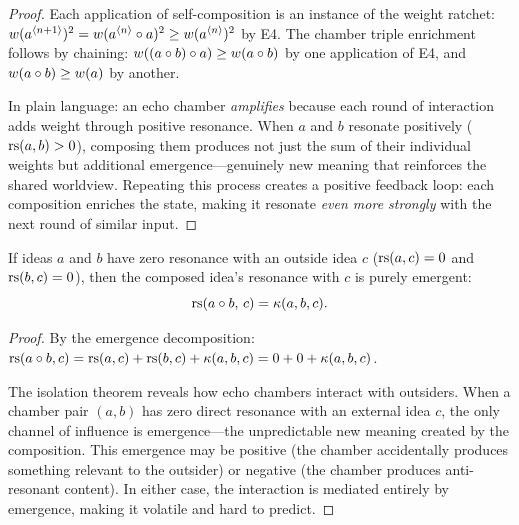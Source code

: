 \begin{proof}
Each application of self-composition is an instance of the weight ratchet:
$w(a^{\langle n+1 \rangle})^2 = w(a^{\langle n \rangle} \circ a)^2
\geq w(a^{\langle n \rangle})^2$ by E4.  The chamber triple enrichment
follows by chaining: $w((a \circ b) \circ a) \geq w(a \circ b)$
by one application of E4, and $w(a \circ b) \geq w(a)$ by another.

In plain language: an echo chamber \emph{amplifies} because each round of
interaction adds weight through positive resonance.  When $a$ and $b$
resonate positively ($\mathrm{rs}(a, b) > 0$), composing them produces not just the
sum of their individual weights but additional emergence---genuinely new
meaning that reinforces the shared worldview.  Repeating this process
creates a positive feedback loop: each composition enriches the state,
making it resonate \emph{even more strongly} with the next round of
similar input.
\end{proof}

\begin{theorem}
\label{thm:chamber-isolation}
If ideas $a$ and $b$ have zero resonance with an outside idea $c$
($\mathrm{rs}(a, c) = 0$ and $\mathrm{rs}(b, c) = 0$), then the composed idea's resonance
with $c$ is purely emergent:
\[
  \mathrm{rs}(a \circ b,\, c) = \kappa(a, b, c).
\]
\end{theorem}

\begin{proof}
By the emergence decomposition: $\mathrm{rs}(a \circ b, c) = \mathrm{rs}(a, c) + \mathrm{rs}(b, c)
+ \kappa(a, b, c) = 0 + 0 + \kappa(a, b, c)$.

The isolation theorem reveals how echo chambers interact with outsiders.
When a chamber pair $(a, b)$ has zero direct resonance with an external
idea $c$, the only channel of influence is emergence---the unpredictable
new meaning created by the composition.  This emergence may be positive
(the chamber accidentally produces something relevant to the outsider)
or negative (the chamber produces anti-resonant content).  In either case,
the interaction is mediated entirely by emergence, making it volatile and
hard to predict.
\end{proof}

